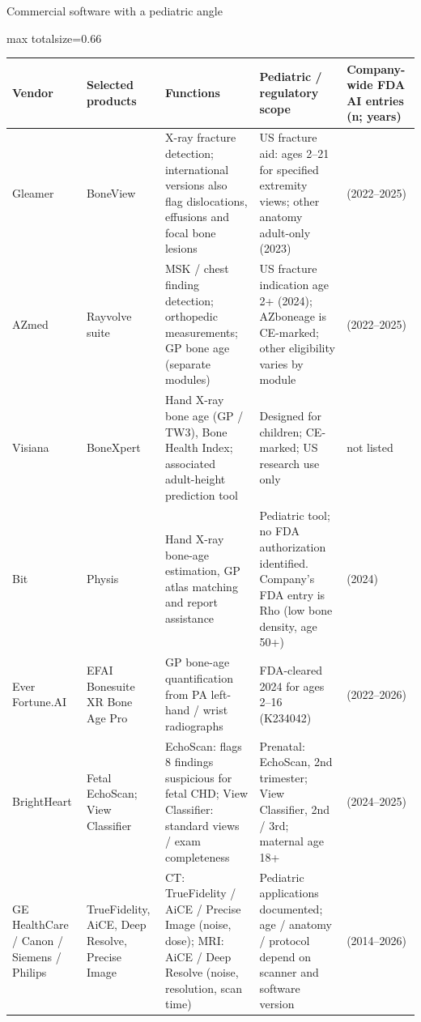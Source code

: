 \documentclass[aspectratio=169]{beamer}
\renewcommand{\arraystretch}{1.08}
\begin{document}
\begin{frame}[category=Commercial Software]{Commercial software with a pediatric angle}
\tiny
\begin{adjustbox}{max totalsize={\textwidth}{0.66\textheight}}
\renewcommand{\arraystretch}{1.2}
\begin{tabular}{|>{\raggedright\arraybackslash}p{}|>{\raggedright\arraybackslash}p{}|>{\raggedright\arraybackslash}p{}|>{\raggedright\arraybackslash}p{}|>{\raggedright\arraybackslash}p{}|}
\hline \textbf{Vendor} & \textbf{Selected products} & \textbf{Functions} & \textbf{Pediatric / regulatory scope} & \textbf{Company-wide FDA AI entries (n; years)} \\ \hline
Gleamer & BoneView & X-ray fracture detection; international versions also flag dislocations, effusions and focal bone lesions & US fracture aid: ages 2--21 for specified extremity views; other anatomy adult-only (2023) & 4 (2022--2025) \\ \hline
AZmed & Rayvolve suite & MSK / chest finding detection; orthopedic measurements; GP bone age (separate modules) & US fracture indication age 2+ (2024); AZboneage is CE-marked; other eligibility varies by module & 4 (2022--2025) \\ \hline
Visiana & BoneXpert & Hand X-ray bone age (GP / TW3), Bone Health Index; associated adult-height prediction tool & Designed for children; CE-marked; US research use only & not listed \\ \hline
16 Bit & Physis & Hand X-ray bone-age estimation, GP atlas matching and report assistance & Pediatric tool; no FDA authorization identified. Company's FDA entry is Rho (low bone density, age 50+) & 1 (2024) \\ \hline
Ever Fortune.AI & EFAI Bonesuite XR Bone Age Pro & GP bone-age quantification from PA left-hand / wrist radiographs & FDA-cleared 2024 for ages 2--16 (K234042) & 11 (2022--2026) \\ \hline
BrightHeart & Fetal EchoScan; View Classifier & EchoScan: flags 8 findings suspicious for fetal CHD; View Classifier: standard views / exam completeness & Prenatal: EchoScan, 2nd trimester; View Classifier, 2nd / 3rd; maternal age 18+ & 5 (2024--2025) \\ \hline
GE HealthCare / Canon / Siemens / Philips & TrueFidelity, AiCE, Deep Resolve, Precise Image & CT: TrueFidelity / AiCE / Precise Image (noise, dose); MRI: AiCE / Deep Resolve (noise, resolution, scan time) & Pediatric applications documented; age / anatomy / protocol depend on scanner and software version & 284 (2014--2026) \\ \hline

\end{tabular}
\end{adjustbox}
\end{frame}
\end{document}

